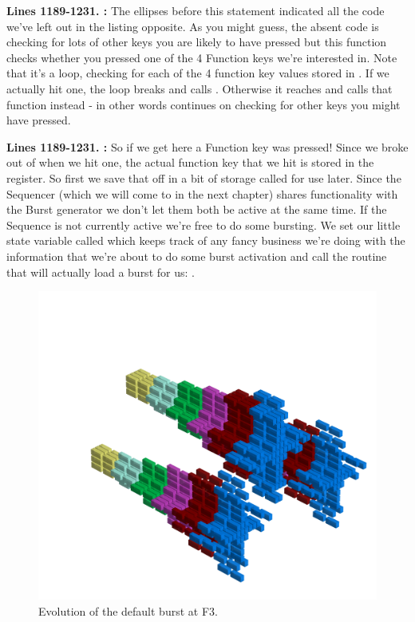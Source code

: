 \textbf{Lines 1189-1231. :} The ellipses before this statement indicated all the code we've
left out in the listing opposite. As you might guess, the absent code is checking for lots of other keys you are likely to have pressed but
this function checks whether you pressed one of the 4 Function keys we're interested in. Note that it's a loop, checking for each of the 4
function key values stored in . If we actually hit one, the loop breaks and calls . Otherwise
it reaches  and calls that function instead - in other words continues on checking for other keys you might have
pressed.

\textbf{Lines 1189-1231. :} So if we get here a Function key was pressed! Since we broke out of 
when we hit one, the actual function key that we hit is stored in the  register. So first we save that off in a bit of storage called
 for use later. Since the Sequencer (which we will come to in the next chapter) shares functionality with the Burst generator
we don't let them both be active at the same time. If the Sequence is not currently active we're free to do some bursting. We set our little state
variable called  which keeps track of any fancy business we're doing with the information that we're about to do some 
burst activation and call the routine that will actually load a burst for us: .


\clearpage
\begin{figure}[H]
    \centering
    \begin{adjustbox}{width=12cm,center}
      \includegraphics[width=12cm]{src/patterns/bursts/pattern1-45.png}%
    \end{adjustbox}
\caption{Evolution of the default burst at F3.}
\end{figure}
\clearpage

